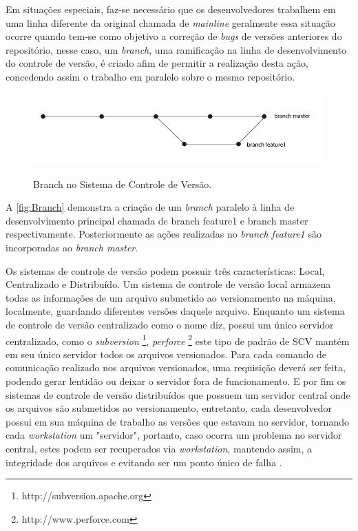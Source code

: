 Em situações especiais, faz-se necessário que os desenvolvedores trabalhem em uma linha diferente da original chamada de \textit{mainline} geralmente essa situação ocorre quando tem-se como objetivo a correção de \textit{bugs} de versões anteriores do repositório, nesse caso, um \textit{branch}, uma ramificação na linha de desenvolvimento do controle de versão, é criado afim de permitir a realização desta ação, concedendo assim o trabalho em paralelo sobre o mesmo repositório.
\begin{figure}[h]
\centering
\caption[Branch no Sistema de Controle de Versão]{Branch no Sistema de Controle de Versão.}
\includegraphics[width=0.5\linewidth]{./images/branch}
\label{fig:Branch}
\end{figure}
A \autoref{fig:Branch} demonstra a criação de um \textit{branch} paralelo à linha de desenvolvimento principal chamada de branch feature1 e branch master respectivamente. Posteriormente as ações realizadas no \textit{branch feature1} são incorporadas ao \textit{branch master}.

Os sistemas de controle de versão podem possuir três características: Local, Centralizado e Distribuído. Um sistema de controle de versão local armazena todas as informações de um arquivo submetido ao versionamento na máquina, localmente, guardando diferentes versões daquele arquivo. Enquanto um sistema de controle de versão centralizado como o nome diz, possui um único servidor centralizado, como o \textit{subversion} \footnote{http://subversion.apache.org}, \textit{perforce} \footnote{http://www.perforce.com} este tipo de padrão de SCV mantém em seu único servidor todos os arquivos versionados. Para cada comando de comunicação realizado nos arquivos versionados, uma requisição deverá ser feita, podendo gerar lentidão ou deixar o servidor fora de funcionamento. E por fim os sistemas de controle de versão distribuídos que possuem um servidor central onde os arquivos são submetidos ao versionamento, entretanto, cada desenvolvedor possui em sua máquina de trabalho as versões que estavam no servidor, tornando cada \textit{workstation} um "servidor", portanto, caso ocorra um problema no servidor central, estes podem ser recuperados via \textit{workstation}, mantendo assim, a integridade dos arquivos e evitando ser um ponto único de falha \cite{git}	.


